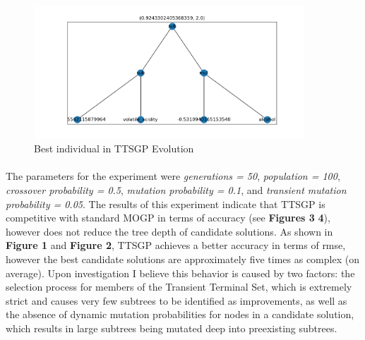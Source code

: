 \documentclass[a4paper]{article}
\begin{document}
\begin{figure}[H]
	\caption{Best individual in TTSGP Evolution}
	\centering
	\includegraphics[width=0.9\textwidth]{Figure_4}
\end{figure}
\paragraph{} The parameters for the experiment were \textit{generations = 50}, \textit{population = 100}, \textit{crossover probability = 0.5}, \textit{mutation probability = 0.1}, and \textit{transient mutation probability = 0.05}. The results of this experiment indicate that TTSGP is competitive with standard MOGP in terms of accuracy (see \textbf{Figures 3} \textbf{4}), however does not reduce the tree depth of candidate solutions. As shown in \textbf{Figure 1} and \textbf{Figure 2}, TTSGP achieves a better accuracy in terms of rmse, however the best candidate solutions are approximately five times as complex (on average). Upon investigation I believe this behavior is caused by two factors: the selection process for members of the Transient Terminal Set, which is extremely strict and causes very few subtrees to be identified as improvements, as well as the absence of dynamic mutation probabilities for nodes in a candidate solution, which results in large subtrees being mutated deep into preexisting subtrees.

\end{document}
